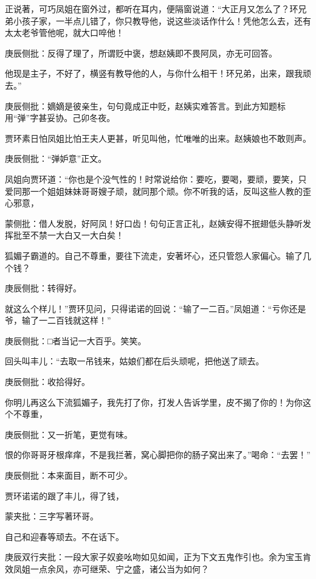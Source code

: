 \begin{parag}
    正说著，可巧凤姐在窗外过，都听在耳内，便隔窗说道：“大正月又怎么了？环兄弟小孩子家，一半点儿错了，你只教导他，说这些淡话作什么！凭他怎么去，还有太太老爷管他呢，就大口啐他！\begin{note}庚辰侧批：反得了理了，所谓贬中褒，想赵姨即不畏阿凤，亦无可回答。\end{note}他现是主子，不好了，横竖有教导他的人，与你什么相干！环兄弟，出来，跟我顽去。”\begin{note}庚辰侧批：嫡嫡是彼亲生，句句竟成正中贬，赵姨实难答言。到此方知题标用“弹”字甚妥协。己卯冬夜。\end{note}贾环素日怕凤姐比怕王夫人更甚，听见叫他，忙唯唯的出来。赵姨娘也不敢则声。\begin{note}庚辰侧批：“弹妒意”正文。\end{note}凤姐向贾环道：“你也是个没气性的！时常说给你：要吃，要喝，要顽，要笑，只爱同那一个姐姐妹妹哥哥嫂子顽，就同那个顽。你不听我的话，反叫这些人教的歪心邪意，\begin{note}蒙侧批：借人发脱，好阿凤！好口齿！句句正言正礼，赵姨安得不抿翅低头静听发挥批至不禁一大白又一大白矣！\end{note}狐媚子霸道的。自己不尊重，要往下流走，安著坏心，还只管怨人家偏心。输了几个钱？\begin{note}庚辰侧批：转得好。\end{note}就这么个样儿！”贾环见问，只得诺诺的回说：“输了一二百。”凤姐道：“亏你还是爷，输了一二百钱就这样！”\begin{note}庚辰侧批：□者当记一大百乎。笑笑。\end{note}回头叫丰儿：“去取一吊钱来，姑娘们都在后头顽呢，把他送了顽去。\begin{note}庚辰侧批：收拾得好。\end{note}你明儿再这么下流狐媚子，我先打了你，打发人告诉学里，皮不揭了你的！为你这个不尊重，\begin{note}庚辰侧批：又一折笔，更觉有味。\end{note}恨的你哥哥牙根痒痒，不是我拦著，窝心脚把你的肠子窝出来了。”喝命：“去罢！”\begin{note}庚辰侧批：本来面目，断不可少。\end{note}贾环诺诺的跟了丰儿，得了钱，\begin{note}蒙夹批：三字写著环哥。\end{note}自己和迎春等顽去。不在话下。\begin{note}庚辰双行夹批：一段大家子奴妾吆吻如见如闻，正为下文五鬼作引也。余为宝玉肯效凤姐一点余风，亦可继荣、宁之盛，诸公当为如何？\end{note}
\end{parag}


